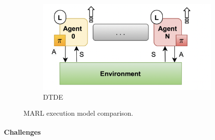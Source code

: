 \documentclass[12pt,a4paper,openright,twoside]{book}
\begin{document}
\begin{figure}[t]
\begin{subfigure}[b]{0.32\textwidth}
        \label{fig:ctde}
    \end{subfigure}
    \begin{subfigure}[b]{0.32\textwidth}
        \centering
        \includegraphics[width=\textwidth]{figures/DTDE.png}
        \caption{DTDE}
        \label{fig:dtde}
    \end{subfigure}
    \caption{MARL execution model comparison.}\vspace{-10pt}
    \label{fig:exmod}
\end{figure}

\paragraph{Challenges}
\end{document}
